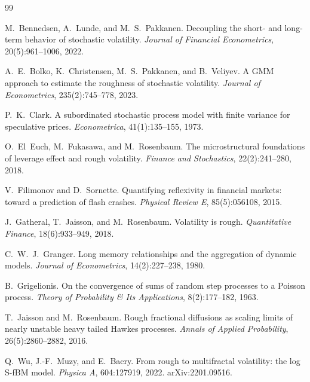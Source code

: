 \documentclass[11pt]{article}
\begin{document}

\begin{thebibliography}{99}

M.~Bennedsen, A.~Lunde, and M.~S.~Pakkanen.
\newblock Decoupling the short- and long-term behavior of stochastic volatility.
\newblock \emph{Journal of Financial Econometrics}, 20(5):961--1006, 2022.

A.~E.~Bolko, K.~Christensen, M.~S.~Pakkanen, and B.~Veliyev.
\newblock A GMM approach to estimate the roughness of stochastic volatility.
\newblock \emph{Journal of Econometrics}, 235(2):745--778, 2023.

P.~K.~Clark.
\newblock A subordinated stochastic process model with finite variance for speculative prices.
\newblock \emph{Econometrica}, 41(1):135--155, 1973.

O.~El~Euch, M.~Fukasawa, and M.~Rosenbaum.
\newblock The microstructural foundations of leverage effect and rough volatility.
\newblock \emph{Finance and Stochastics}, 22(2):241--280, 2018.

V.~Filimonov and D.~Sornette.
\newblock Quantifying reflexivity in financial markets: toward a prediction of flash crashes.
\newblock \emph{Physical Review E}, 85(5):056108, 2015.

J.~Gatheral, T.~Jaisson, and M.~Rosenbaum.
\newblock Volatility is rough.
\newblock \emph{Quantitative Finance}, 18(6):933--949, 2018.

C.~W.~J.~Granger.
\newblock Long memory relationships and the aggregation of dynamic models.
\newblock \emph{Journal of Econometrics}, 14(2):227--238, 1980.

B.~Grigelionis.
\newblock On the convergence of sums of random step processes to a Poisson process.
\newblock \emph{Theory of Probability \& Its Applications}, 8(2):177--182, 1963.

T.~Jaisson and M.~Rosenbaum.
\newblock Rough fractional diffusions as scaling limits of nearly unstable heavy tailed Hawkes processes.
\newblock \emph{Annals of Applied Probability}, 26(5):2860--2882, 2016.

Q.~Wu, J.-F.~Muzy, and E.~Bacry.
\newblock From rough to multifractal volatility: the log S-fBM model.
\newblock \emph{Physica A}, 604:127919, 2022. arXiv:2201.09516.


\end{thebibliography}
\end{document}
